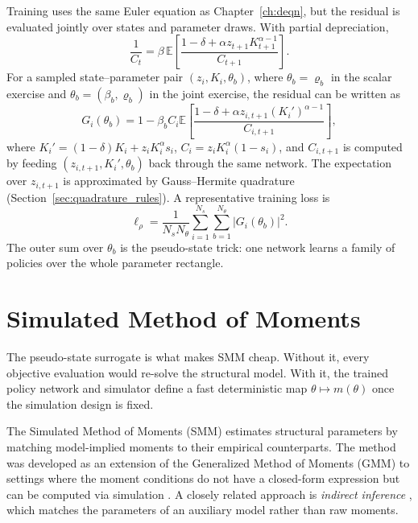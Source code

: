 \documentclass[11pt,a4paper]{report}
\newcommand{\E}[1]{\mathbb{E}\!\left[#1\right]}
\begin{document}
Training uses the same Euler equation as Chapter~\ref{ch:deqn}, but the residual is evaluated jointly over states and parameter draws.  With partial depreciation,
\[
\frac{1}{C_t}
=
\beta\,\E{\frac{1-\delta+\alpha z_{t+1}K_{t+1}^{\alpha-1}}{C_{t+1}}}.
\]
For a sampled state--parameter pair $(z_i,K_i,\theta_b)$, where $\theta_b=\varrho_b$ in the scalar exercise and $\theta_b=(\beta_b,\varrho_b)$ in the joint exercise, the residual can be written as
\begin{equation}
G_i(\theta_b)
=
1
-
\beta_b C_i
\E{\frac{1-\delta+\alpha z_{i,t+1}(K_i')^{\alpha-1}}{C_{i,t+1}}},
\label{eq:smm_euler_residual}
\end{equation}
where $K_i'=(1-\delta)K_i+z_iK_i^\alpha s_i$, $C_i=z_iK_i^\alpha(1-s_i)$, and $C_{i,t+1}$ is computed by feeding $(z_{i,t+1},K_i',\theta_b)$ back through the same network.  The expectation over $z_{i,t+1}$ is approximated by Gauss--Hermite quadrature (Section~\ref{sec:quadrature_rules}).  A representative training loss is
\begin{equation}
\ell_\rho
=
\frac{1}{N_sN_\theta}
\sum_{i=1}^{N_s}\sum_{b=1}^{N_\theta}
\left|G_i(\theta_b)\right|^2.
\end{equation}
The outer sum over $\theta_b$ is the pseudo-state trick: one network learns a family of policies over the whole parameter rectangle.

\section{Simulated Method of Moments}
\label{sec:smm_method}

The pseudo-state surrogate is what makes SMM cheap.  Without it, every objective evaluation would re-solve the structural model.  With it, the trained policy network and simulator define a fast deterministic map $\theta\mapsto m(\theta)$ once the simulation design is fixed.

The Simulated Method of Moments (SMM) estimates structural parameters by matching model-implied moments to their empirical counterparts.  The method was developed as an extension of the Generalized Method of Moments (GMM) to settings where the moment conditions do not have a closed-form expression but can be computed via simulation \citep{mcfadden1989method, pakes1989simulation, lee1991simulation, duffie1993simulated}.  A closely related approach is \emph{indirect inference} \citep{gourieroux1993indirect}, which matches the parameters of an auxiliary model rather than raw moments.
\end{document}
